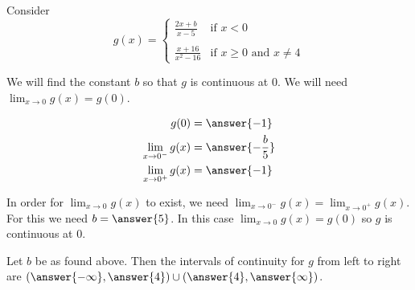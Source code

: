\documentclass{ximera}
\author{Nela Lakos \and Kyle Parsons}
\begin{document}
\begin{exercise}
	Consider
	\[
		g(x) = 
			\begin{cases}
				\frac{2x+b}{x-5} & \text{if }x<0\\ \\
				\frac{x+16}{x^2-16} & \text{if }x\geq0\text{ and }x\neq4
			\end{cases}
	\]

	We will find the constant $b$ so that $g$ is continuous at 0.  We will need $\lim_{x\to0}g(x) = g(0)$.  

	\begin{align*}
		g(0) &= \answer{-1}\\
		\lim_{x\to0^-} g(x) &= \answer{-\frac{b}{5}}\\
		\lim_{x\to0^+} g(x) &= \answer{-1}
	\end{align*}

	\begin{exercise}
		In order for $\lim_{x\to0}g(x)$ to exist, we need $\lim_{x\to0^-}g(x) = \lim_{x\to0^+}g(x)$. For this we need $b = \answer{5}$.  In this case $\lim_{x\to0}g(x) = g(0)$ so $g$ is continuous at 0.

		\begin{exercise}
			Let $b$ be as found above.  Then the intervals of continuity for $g$ from left to right are $\left(\answer{-\infty},\answer{4}\right)\cup\left(\answer{4},\answer{\infty}\right)$.
		\end{exercise}
	\end{exercise}
\end{exercise}
\end{document}

